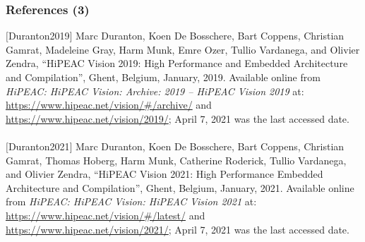 \begin{frame}
	\frametitle{References (3)}

	$[$Duranton2019$]$ Marc Duranton, Koen {De Bosschere}, Bart Coppens, Christian Gamrat, Madeleine Gray, Harm Munk, Emre Ozer, Tullio Vardanega, and Olivier Zendra, ``{HiPEAC} Vision 2019: High Performance and Embedded Architecture and Compilation'', Ghent, Belgium, January, 2019. Available online from {\it {HiPEAC}: {HiPEAC} Vision: Archive: 2019 -- {HiPEAC} Vision 2019} at: \url{https://www.hipeac.net/vision/#/archive/} and \url{https://www.hipeac.net/vision/2019/}; April 7, 2021 was the last accessed date. \\
	\ \\
	$[$Duranton2021$]$ Marc Duranton, Koen {De Bosschere}, Bart Coppens, Christian Gamrat, Thomas Hoberg, Harm Munk, Catherine Roderick, Tullio Vardanega, and Olivier Zendra, ``{HiPEAC} Vision 2021: High Performance Embedded Architecture and Compilation'', Ghent, Belgium, January, 2021. Available online from {\it {HiPEAC}: {HiPEAC} Vision: {HiPEAC} Vision 2021} at: \url{https://www.hipeac.net/vision/#/latest/} and \url{https://www.hipeac.net/vision/2021/}; April 7, 2021 was the last accessed date.


\end{frame}








